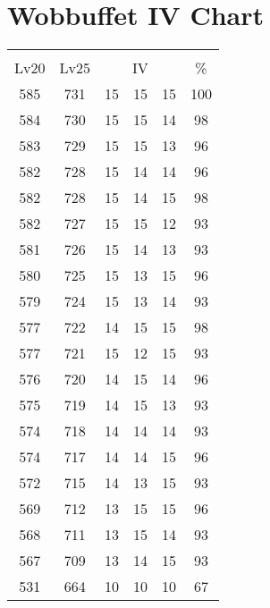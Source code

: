 \documentclass{article}%
\begin{document}
%
\normalsize%
\section{Wobbuffet IV Chart}%
\label{sec:Wobbuffet IV Chart}%
\renewcommand{\arraystretch}{1.5}%
\begin{tabular}{|c|c|c|c|c|c|}%
\hline%
\multicolumn{6}{|c|}{\textcolor{white}{ 
\linebreak{Wobbuffet}
}%
\cellcolor{black}}\\%
\multicolumn{1}{|c}{Lv20}&\multicolumn{1}{c|}{Lv25}&\multicolumn{3}{c|}{IV}&\multicolumn{1}{|c|}{\%}\\%
\hline%
\rowcolor{color100}%
585&731&15&15&15&100\\%
\hline%
\rowcolor{color98}%
584&730&15&15&14&98\\%
\hline%
\rowcolor{color96}%
583&729&15&15&13&96\\%
\hline%
\rowcolor{color96}%
582&728&15&14&14&96\\%
\hline%
\rowcolor{color98}%
582&728&15&14&15&98\\%
\hline%
\rowcolor{color93}%
582&727&15&15&12&93\\%
\hline%
\rowcolor{color93}%
581&726&15&14&13&93\\%
\hline%
\rowcolor{color96}%
580&725&15&13&15&96\\%
\hline%
\rowcolor{color93}%
579&724&15&13&14&93\\%
\hline%
\rowcolor{color98}%
577&722&14&15&15&98\\%
\hline%
\rowcolor{color93}%
577&721&15&12&15&93\\%
\hline%
\rowcolor{color96}%
576&720&14&15&14&96\\%
\hline%
\rowcolor{color93}%
575&719&14&15&13&93\\%
\hline%
\rowcolor{color93}%
574&718&14&14&14&93\\%
\hline%
\rowcolor{color96}%
574&717&14&14&15&96\\%
\hline%
\rowcolor{color93}%
572&715&14&13&15&93\\%
\hline%
\rowcolor{color96}%
569&712&13&15&15&96\\%
\hline%
\rowcolor{color93}%
568&711&13&15&14&93\\%
\hline%
\rowcolor{color93}%
567&709&13&14&15&93\\%
\hline%
\rowcolor{color91}%
531&664&10&10&10&67\\%
\end{tabular}

%
\end{document}
